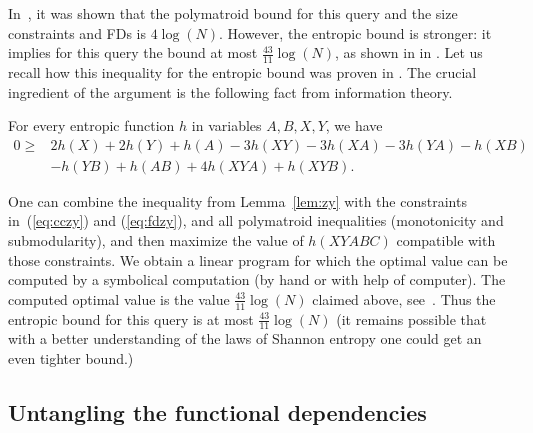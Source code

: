 \documentclass[a4paper,cleveref]{lipics-v2021}
\begin{document}
In~\cite{Suciu23,Khamis0S17}, it was shown that the polymatroid bound for this query and the size constraints and FDs is $4\log(N)$. 
However, the entropic bound is stronger: it implies for this query the bound at most $\frac{43}{11}\log(N)$, 
%
as shown in in  \cite{Khamis0S17}. Let us recall how this inequality for the entropic bound was proven in  \cite{Khamis0S17}. 
The crucial ingredient of the argument is the following fact from information theory.
\begin{lemma}\label{lem:zy} For every entropic function $h$ in variables $A,B,X,Y$, we have
\begin{align*}\label{eq:non-shannon}
	0 \ge & 2 h(X) + 2 h(Y) + h(A) - 3 h(XY) - 3 h(XA) - 3 h(YA) - h(XB) \\ &- h(YB)+ h(AB) + 4 h(XYA) + h(XYB).
\end{align*}
\end{lemma}
%
One can  combine the inequality from Lemma~\ref{lem:zy} with the constraints in~(\ref{eq:cczy}) and (\ref{eq:fdzy}),
and all polymatroid inequalities (monotonicity and submodularity), and then maximize the value of $h(XYABC)$ compatible with those constraints.
We obtain a linear program for which the optimal value can be computed by a symbolical computation
(by hand or with help of computer). The computed optimal value is the value $\frac{43}{11}\log(N)$ claimed above, see~\cite{Khamis0S17,Suciu23}.
Thus the entropic bound for this query is at most $\frac{43}{11}\log(N)$
(it remains possible that with a better understanding of the laws of Shannon entropy one could get an even tighter bound.)

\subsection{Untangling the functional dependencies}\label{sec:untangling}
\end{document}
